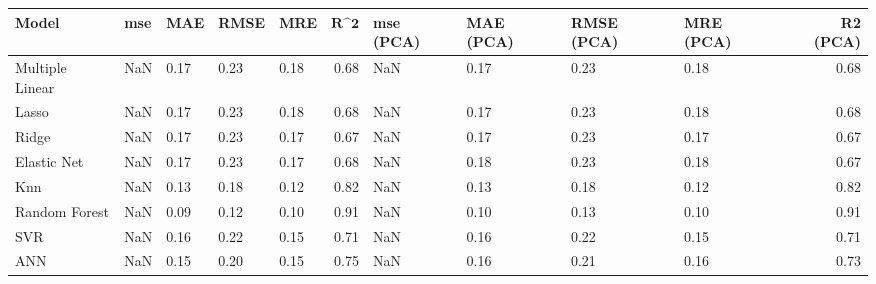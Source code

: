 \begin{table}
\centering
\label{table:iri_reg_pred}
\begin{tabular}{lllllrllllr}
\toprule
 \textbf{Model} & \textbf{mse} & \textbf{MAE} & \textbf{RMSE} & \textbf{MRE} & $\textbf{R^2}$ & \textbf{mse (PCA)} & \textbf{MAE (PCA)} & \textbf{RMSE (PCA)} & \textbf{MRE (PCA)} & \textbf{R2 (PCA)} \\
\midrule
Multiple Linear &          NaN &         0.17 &          0.23 &         0.18 &           0.68 &                NaN &               0.17 &                0.23 &               0.18 &              0.68 \\
          Lasso &          NaN &         0.17 &          0.23 &         0.18 &           0.68 &                NaN &               0.17 &                0.23 &               0.18 &              0.68 \\
          Ridge &          NaN &         0.17 &          0.23 &         0.17 &           0.67 &                NaN &               0.17 &                0.23 &               0.17 &              0.67 \\
    Elastic Net &          NaN &         0.17 &          0.23 &         0.17 &           0.68 &                NaN &               0.18 &                0.23 &               0.18 &              0.67 \\
            Knn &          NaN &         0.13 &          0.18 &         0.12 &           0.82 &                NaN &               0.13 &                0.18 &               0.12 &              0.82 \\
  Random Forest &          NaN &         0.09 &          0.12 &         0.10 &           0.91 &                NaN &               0.10 &                0.13 &               0.10 &              0.91 \\
            SVR &          NaN &         0.16 &          0.22 &         0.15 &           0.71 &                NaN &               0.16 &                0.22 &               0.15 &              0.71 \\
            ANN &          NaN &         0.15 &          0.20 &         0.15 &           0.75 &                NaN &               0.16 &                0.21 &               0.16 &              0.73 \\
\bottomrule
\end{tabular}
\end{table}
